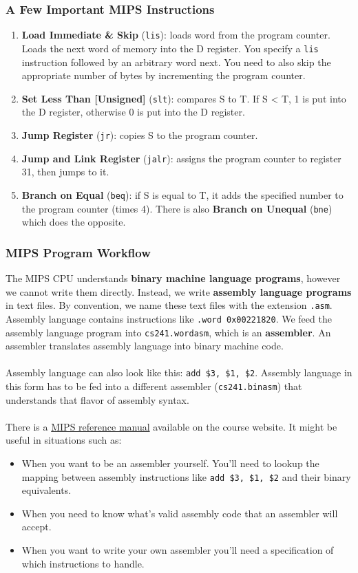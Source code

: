 \documentclass[]{article}
\theoremstyle{definition}
\newcommand{\lecture}[1]{\marginpar{{\footnotesize $\leftarrow$ \underline{#1}}}}
\begin{document}
		\subsubsection{A Few Important MIPS Instructions}
			\begin{enumerate}
				\item \textbf{Load Immediate \& Skip} (\verb+lis+): loads word from the program counter. Loads the next word of memory into the D register. You specify a \verb+lis+ instruction followed by an arbitrary word next. You need to also skip the appropriate number of bytes by incrementing the program counter.
				\item \textbf{Set Less Than [Unsigned]} (\verb+slt+): compares S to T. If S < T, 1 is put into the D register, otherwise 0 is put into the D register.
				\item \textbf{Jump Register} (\verb+jr+): copies S to the program counter.
				\item \textbf{Jump and Link Register} (\verb+jalr+): assigns the program counter to register 31, then jumps to it.
				\item \textbf{Branch on Equal} (\verb+beq+): if S is equal to T, it adds the specified number to the program counter (times 4). There is also \textbf{Branch on Unequal} (\verb+bne+) which does the opposite.
			\end{enumerate}
		\subsubsection{MIPS Program Workflow}
			\lecture{January 14, 2013}
			The MIPS CPU understands \textbf{binary machine language programs}, however we cannot write them directly. Instead, we write \textbf{assembly language programs} in text files. By convention, we name these text files with the extension \verb+.asm+. Assembly language contains instructions like \verb+.word 0x00221820+. We feed the assembly language program into \verb+cs241.wordasm+, which is an \textbf{assembler}. An assembler translates assembly language into binary machine code.
			\\ \\
			Assembly language can also look like this: \verb+add $3, $1, $2+. Assembly language in this form has to be fed into a different assembler (\verb+cs241.binasm+) that understands that flavor of assembly syntax.
			\\ \\
			There is a \href{https://www.student.cs.uwaterloo.ca/~cs241/mips/mipsasm.html}{MIPS reference manual} available on the course website. It might be useful in situations such as:
			\begin{itemize}
				\item When you want to be an assembler yourself. You'll need to lookup the mapping between assembly instructions like \verb+add $3, $1, $2+ and their binary equivalents.
				\item When you need to know what's valid assembly code that an assembler will accept.
				\item When you want to write your own assembler you'll need a specification of which instructions to handle.
			\end{itemize}
\end{document}
